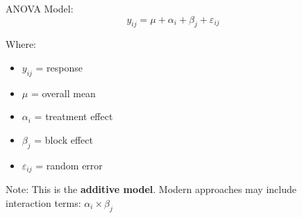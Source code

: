 \documentclass[aspectratio=43]{beamer}
\begin{document}
\begin{frame}
\begin{columns}
\begin{column}{0.65\textwidth}
\begin{center}
            \end{center}
        \end{column}
        
        \begin{column}{0.35\textwidth}
            \begin{block}{ANOVA Model:}
                \begin{equation*}
                    y_{ij} = \mu + \alpha_i + \beta_j + \varepsilon_{ij}
                \end{equation*}
                
                \small
                Where:
                \begin{itemize}
                    \item $y_{ij}$ = response
                    \item $\mu$ = overall mean
                    \item $\alpha_i$ = treatment effect
                    \item $\beta_j$ = block effect
                    \item $\varepsilon_{ij}$ = random error
                \end{itemize}
            \end{block}
            
            \begin{alertblock}{\tiny Note:}
                {\tiny This is the \textbf{additive model}. Modern approaches may include interaction terms: $\alpha_i \times \beta_j$}
            \end{alertblock}
        \end{column}
    \end{columns}
\end{frame}
\end{document}
